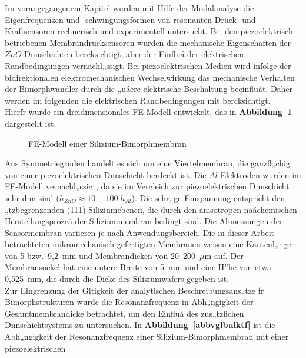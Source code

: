 Im vorangegangenem Kapitel wurden mit Hilfe der Modalanalyse die
Eigenfrequenzen und -schwingungsformen von resonanten Druck- und
Kraftsensoren rechnerisch und experimentell untersucht. Bei den
piezoelektrisch betriebenen Membrandrucksensoren wurden die mechanische
Eigenschaften der $ZnO$-Dnnschichten bercksichtigt, aber der
Einfluá der elektrischen Randbedingungen vernachl„ssigt. Bei
piezoelektrischen Medien wird infolge der bidirektionalen
elektromechanischen Wechselwirkung das mechanische Verhalten der
Bimorphwandler durch die „uáere elektrische Beschaltung beeinfluát.
Daher werden im folgenden die elektrischen Randbedingungen mit
bercksichtigt.\\
Hierfr wurde ein dreidimensionales FE-Modell entwickelt, das
in {\bf Abbildung~\ref{abbbimorph}} dargestellt ist.
\begin{figure}[htb]

\begin{center}

\setabbfein
\end{center}
\caption{\label{abbbimorph}
 FE-Modell einer Silizium-Bimorphmembran}
\end{figure}
Aus Symmetriegrnden
handelt es sich um eine Viertelmembran, die ganzfl„chig von einer
piezoelektrischen Dnnschicht berdeckt ist. Die $Al$-Elektroden wurden
im FE-Modell vernachl„ssigt, da sie im Vergleich zur piezoelektrischen
Dnnschicht sehr dnn sind ($h_{ZnO} \approx 10-100 \; h_{Al}$). Die
schr„ge
Einspannung entspricht den „tzbegrenzenden (111)-Siliziumebenen, die durch
den anisotropen naáchemischen Herstellungsprozeá der Siliziummembran
bedingt sind. Die Abmessungen der
Sensormembran variieren je nach Anwendungsbereich. Die in dieser Arbeit
betrachteten mikromechanisch gefertigten Membranen weisen eine
Kantenl„nge von 5 bzw.\ 9,2~mm und Membrandicken von 20--200~$\mu$m auf.
Der Membransockel hat eine untere Breite von 5~mm und eine H”he von
etwa 0,525~mm, die durch die Dicke des Siliziumwafers
gegeben ist.\\
Zur Eingrenzung der Gltigkeit der analytischen Beschreibungsans„tze
fr Bimorphstrukturen wurde die Resonanzfrequenz in Abh„ngigkeit der
Gesamtmembrandicke betrachtet, um den Einfluá des zus„tzlichen
Dnnschichtsystems zu untersuchen.
In {\bf Abbildung~\ref{abbvglbulktf}} ist die Abh„ngigkeit der
Resonanzfrequenz einer Silizium-Bimorphmembran mit einer piezoelektrischen
